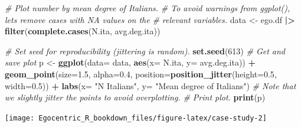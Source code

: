 \documentclass[
]{book}
\newenvironment{Shaded}{\begin{snugshade}}{\end{snugshade}}
\newcommand{\AttributeTok}[1]{\textcolor[rgb]{0.13,0.29,0.53}{#1}}
\newcommand{\CommentTok}[1]{\textcolor[rgb]{0.56,0.35,0.01}{\textit{#1}}}
\newcommand{\DecValTok}[1]{\textcolor[rgb]{0.00,0.00,0.81}{#1}}
\newcommand{\FloatTok}[1]{\textcolor[rgb]{0.00,0.00,0.81}{#1}}
\newcommand{\FunctionTok}[1]{\textcolor[rgb]{0.13,0.29,0.53}{\textbf{#1}}}
\newcommand{\NormalTok}[1]{#1}
\newcommand{\OtherTok}[1]{\textcolor[rgb]{0.56,0.35,0.01}{#1}}
\newcommand{\SpecialCharTok}[1]{\textcolor[rgb]{0.81,0.36,0.00}{\textbf{#1}}}
\newcommand{\StringTok}[1]{\textcolor[rgb]{0.31,0.60,0.02}{#1}}
\begin{document}
\begin{Shaded}
\begin{Highlighting}[]
\CommentTok{\# Plot number by mean degree of Italians.}
\CommentTok{\# To avoid warnings from ggplot(), let\textquotesingle{}s remove cases with NA values on the}
\CommentTok{\# relevant variables.}
\NormalTok{data }\OtherTok{\textless{}{-}}\NormalTok{ ego.df }\SpecialCharTok{|\textgreater{}} 
  \FunctionTok{filter}\NormalTok{(}\FunctionTok{complete.cases}\NormalTok{(N.ita, avg.deg.ita))}

\CommentTok{\# Set seed for reproducibility (jittering is random).}
\FunctionTok{set.seed}\NormalTok{(}\DecValTok{613}\NormalTok{)}
\CommentTok{\# Get and save plot}
\NormalTok{p }\OtherTok{\textless{}{-}} \FunctionTok{ggplot}\NormalTok{(}\AttributeTok{data=}\NormalTok{ data, }\FunctionTok{aes}\NormalTok{(}\AttributeTok{x=}\NormalTok{ N.ita, }\AttributeTok{y=}\NormalTok{ avg.deg.ita)) }\SpecialCharTok{+} 
  \FunctionTok{geom\_point}\NormalTok{(}\AttributeTok{size=}\FloatTok{1.5}\NormalTok{, }\AttributeTok{alpha=}\FloatTok{0.4}\NormalTok{, }\AttributeTok{position=}\FunctionTok{position\_jitter}\NormalTok{(}\AttributeTok{height=}\FloatTok{0.5}\NormalTok{, }\AttributeTok{width=}\FloatTok{0.5}\NormalTok{)) }\SpecialCharTok{+} 
  \FunctionTok{labs}\NormalTok{(}\AttributeTok{x=} \StringTok{"N Italians"}\NormalTok{, }\AttributeTok{y=} \StringTok{"Mean degree of Italians"}\NormalTok{)}
\CommentTok{\# Note that we slightly jitter the points to avoid overplotting.}
\CommentTok{\# Print plot.}
\FunctionTok{print}\NormalTok{(p)}
\end{Highlighting}
\end{Shaded}

\texttt{[image: Egocentric\_R\_bookdown\_files/figure-latex/case-study-2]}
\end{document}
